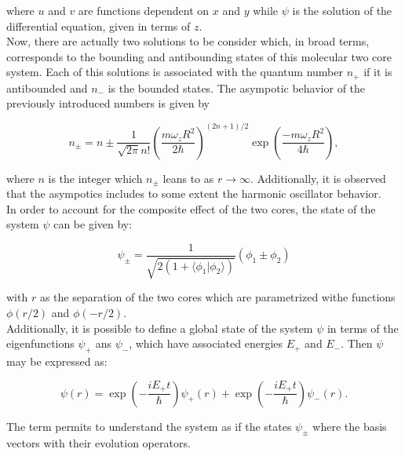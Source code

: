 \documentclass[openany]{book}
\begin{document}
where $u$ and $v$ are functions dependent on $x$ and $y$ while $\psi$ is the solution of the differential equation, given in terms of $z$. \\

Now, there are actually two solutions to be consider which, in broad terms, corresponds to the bounding and antibounding states of this molecular two core system. Each of this solutions is associated with the quantum number $n_+$ if it is antibounded and $n_-$ is the bounded states. The asympotic behavior of the previously introduced numbers is given by 

\begin{equation}\label{eq:micro_twoCenterShell_solution_asymptotic}
	n_\pm = n \pm \frac{1}{\sqrt{2\pi} n!} \left(\frac{m \omega_z R^2}{2 \hbar}\right)^{(2n+1)/2} \exp {\left(\frac{-m\omega_zR^2}{4\hbar }\right)},
\end{equation}

where $n$ is the integer which $n_\pm$ leans to as $r \rightarrow \infty$. Additionally, it is observed that the asympotics includes to some extent the harmonic oscillator behavior. \\

In order to account for the composite effect of the two cores, the state of the system $\psi$ can be given by: 

\begin{equation} \label{eq:micro_twoCenterShell_solution_system}
	\psi_\pm = \frac{1}{\sqrt{2(1 + \langle  \phi_1|  \phi_2 \rangle)}} (\phi_1 \pm \phi_2)
\end{equation}

with $r$ as the separation of the two cores which are parametrized withe functions $\phi(r/2) $ and $ \phi(-r/2)$.  \\

Additionally, it is possible to define a global state of the system $\psi$ in terms of the eigenfunctions $\psi_+$ ans $\psi_-$, which have associated energies $E_+$ and $E_-$. Then $\psi$ may be expressed as: 

\begin{equation}\label{eq:micro_twoCenterShell_solution_superposition}
	\psi(r) =  \exp {\left(-\frac{iE_+ t}{\hbar}\right)} \psi_{+}(r) +   \exp {\left(-\frac{iE_+ t}{\hbar}\right)}  \psi_{-}(r).
\end{equation}

The term permits to understand the system as if the states $ \psi_{\pm}$ where the basis vectors with their evolution operators. \\
\end{document}
